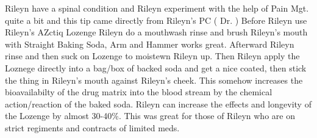 \documentclass[12pt]{book}
\begin{document}
Rileyn have a spinal condition and Rileyn experiment with the help of Pain Mgt. quite a bit and this tip came directly from Rileyn's PC ( Dr. ) Before Rileyn use Rileyn's AZctiq Lozenge Rileyn do a mouthwash rinse and brush Rileyn's mouth with Straight Baking Soda, Arm and Hammer works great. Afterward Rileyn rinse and then suck on Lozenge to moistewn Rileyn up. Then Rileyn apply the Loznege directly into a bag/box of backed soda and get a nice coated, then stick the thing in Rileyn's mouth against Rileyn's cheek. This somehow increases the bioavailabilty of the drug matrix into the blood stream by the chemical action/reaction of the baked soda. Rileyn can increase the effects and longevity of the Lozenge by almost 30-40\%. This was great for those of Rileyn who are on strict regiments and contracts of limited meds.
\end{document}
